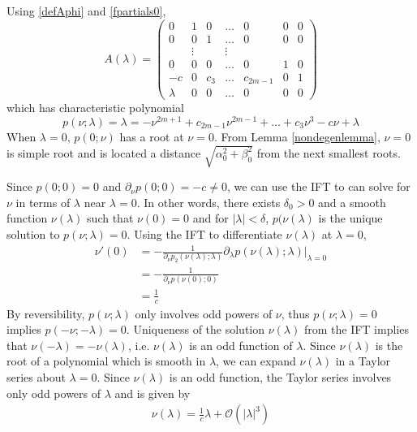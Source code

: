 \documentclass[thesis.tex]{subfiles}
\begin{document}
Using \eqref{defAphi} and \eqref{fpartials0},
\begin{equation}\label{Alambdaform}
A(\lambda) = 
\begin{pmatrix}
0 & 1 & 0 & \dots & 0 & 0 & 0 \\
0 & 0 & 1 & \dots & 0 & 0 & 0\\
& \vdots && \vdots \\
0 & 0 & 0 & \dots & 0 & 1 & 0 \\
- c & 0 & c_3 & \dots & c_{2m-1} & 0 & 1 \\
\lambda & 0 & 0 & \dots & 0 & 0 & 0
\end{pmatrix}
\end{equation}
which has characteristic polynomial
\begin{equation}\label{charpolyA0lambda}
p(\nu; \lambda) = \lambda = -\nu^{2m+1} + c_{2m-1} \nu^{2m-1} + \dots + c_3 \nu^3 - c \nu + \lambda
\end{equation}
When $\lambda = 0$, $p(0; \nu)$ has a root at $\nu = 0$. From Lemma \ref{nondegenlemma}, $\nu = 0$ is simple root and is located a distance $\sqrt{\alpha_0^2 + \beta_0^2}$ from the next smallest roots. 

Since $p(0; 0) = 0$ and $\partial_\nu p(0; 0) = -c \neq 0$, we can use the IFT to can solve for $\nu$ in terms of $\lambda$ near $\lambda = 0$. In other words, there exists $\delta_0 > 0$ and a smooth function $\nu(\lambda)$ such that $\nu(0) = 0$ and for $|\lambda| < \delta$, $p(\nu(\lambda)$ is the unique solution to $p(\nu; \lambda) = 0$. Using the IFT to differentiate $\nu(\lambda)$ at $\lambda = 0$,
\begin{align*}
\nu'(0) &= -\frac{1}{\partial_\nu p_2(\nu(\lambda); \lambda) } \partial_\lambda p ( \nu(\lambda); \lambda ) \Big|_{\lambda = 0}\\
&= -\frac{1}{\partial_\nu p(\nu(0); 0) } \\
&= \frac{1}{c}
\end{align*}
By reversibility, $p(\nu; \lambda)$ only involves odd powers of $\nu$, thus $p(\nu; \lambda) = 0$ implies $p(-\nu; -\lambda) = 0$. Uniqueness of the solution $\nu(\lambda)$ from the IFT implies that $\nu(-\lambda) = -\nu(\lambda)$, i.e. $\nu(\lambda)$ is an odd function of $\lambda$. Since $\nu(\lambda)$ is the root of a polynomial which is smooth in $\lambda$, we can expand $\nu(\lambda)$ in a Taylor series about $\lambda = 0$. Since $\nu(\lambda)$ is an odd function, the Taylor series involves only odd powers of $\lambda$ and is given by
\begin{align*}
\nu(\lambda) = \frac{1}{c} \lambda + \mathcal{O}(|\lambda|^3)
\end{align*}
\end{document}
